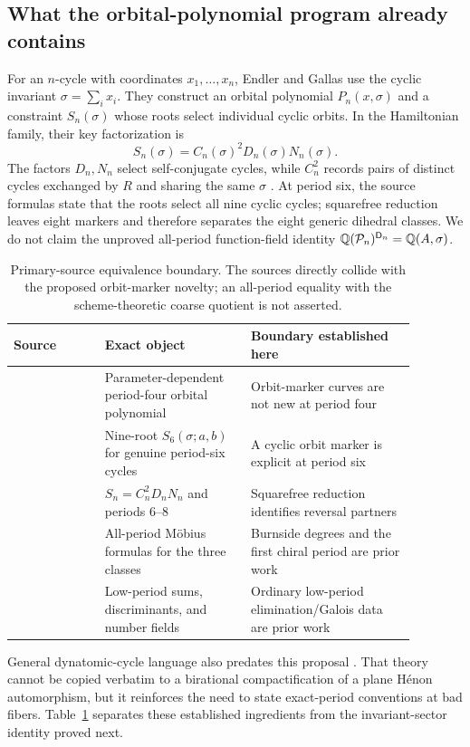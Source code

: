 \subsection{What the orbital-polynomial program already contains}

For an $n$-cycle with coordinates $x_1,\dots,x_n$, Endler and Gallas use the
cyclic invariant $\sigma=\sum_i x_i$.  They construct an orbital polynomial
$P_n(x,\sigma)$ and a constraint $S_n(\sigma)$ whose roots select individual
cyclic orbits.  In the Hamiltonian family, their key factorization is
\begin{equation}\label{eq:CDN}
S_n(\sigma)=C_n(\sigma)^2D_n(\sigma)N_n(\sigma).
\end{equation}
The factors $D_n,N_n$ select self-conjugate cycles, while $C_n^2$ records
pairs of distinct cycles exchanged by $R$ and sharing the same $\sigma$
\citep{endler2006chiral}.  At period six, the source formulas state that the
roots select all nine cyclic cycles; squarefree reduction leaves eight markers
and therefore separates the eight generic dihedral classes.  We do not claim
the unproved all-period function-field identity
$\mathbb Q(\mathcal P_n)^{\mathsf D_n}=\mathbb Q(A,\sigma)$.

\begin{table}[t]
\centering
\small
\begin{tabular}{p{0.20\linewidth}p{0.32\linewidth}p{0.36\linewidth}}
\toprule
Source & Exact object & Boundary established here \\
\midrule
\citet{endler2002} & Parameter-dependent period-four orbital polynomial & Orbit-marker curves are not new at period four \\
\citet{endler2004} & Nine-root $S_6(\sigma;a,b)$ for genuine period-six cycles & A cyclic orbit marker is explicit at period six \\
\citet{endler2006chiral} & $S_n=C_n^2D_nN_n$ and periods 6--8 & Squarefree reduction identifies reversal partners \\
\citet{gallas2007} & All-period M\"obius formulas for the three classes & Burnside degrees and the first chiral period are prior work \\
\citet{endler2006sums} & Low-period sums, discriminants, and number fields & Ordinary low-period elimination/Galois data are prior work \\
\bottomrule
\end{tabular}
\caption{Primary-source equivalence boundary.  The sources directly collide
with the proposed orbit-marker novelty; an all-period equality with the
scheme-theoretic coarse quotient is not asserted.}
\label{tab:prior}
\end{table}

General dynatomic-cycle language also predates this proposal
\citep{hutz2010}.  That theory cannot be copied verbatim to a birational
compactification of a plane H\'enon automorphism, but it reinforces the need to
state exact-period conventions at bad fibers.  Table~\ref{tab:prior} separates
these established ingredients from the invariant-sector identity proved next.
